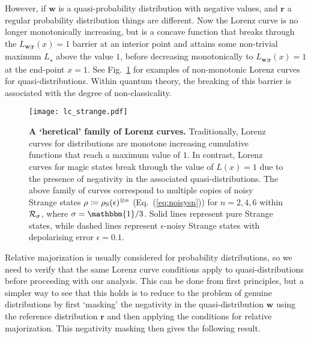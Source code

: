 \documentclass[
onecolumn,
superscriptaddress
]{revtex4-1}
\def\id{\mathbbm{1}}
\def\r{\boldsymbol{r}}
\def\w{\boldsymbol{w}}
\def\R{{\cal R}}
\begin{document}
However, if $\w$ is a quasi-probability distribution with negative values, and $\r$ a regular probability distribution things are different. Now the Lorenz curve is no longer monotonically increasing, but is a concave function that breaks through the $L_{\w|\r}(x) = 1$ barrier at an interior point and attains some non-trivial maximum $L_\star$ above the value $1$, before decreasing monotonically to $L_{\w|\r}(x)= 1$ at the end-point $x=1$. See Fig.~\ref{fig:lcs} for examples of non-monotonic Lorenz curves for quasi-distributions. Within quantum theory, the breaking of this barrier is associated with the degree of non-classicality.

\begin{figure}
    \centering
    \texttt{[image: lc\_strange.pdf]}
    \caption{\textbf{A `heretical' family of Lorenz curves.} Traditionally, Lorenz curves for distributions are monotone increasing cumulative functions that reach a maximum value of $1$. In contrast, Lorenz curves for magic states break through the value of $L(x)=1$ due to the presence of negativity in the associated quasi-distributions. The above family of curves correspond to multiple copies of noisy Strange states $\rho\coloneqq\rho_{\rm{S}}(\epsilon)^{\otimes n}$ (Eq.~(\ref{eq:noisysn})) for $n=2,4,6$ within $\R_{\sigma}$, where $\sigma = \id/3$. Solid lines represent pure Strange states, while dashed lines represent $\epsilon$-noisy Strange states with depolarising error $\epsilon = 0.1$.
    }
    \label{fig:lcs}
\end{figure}

Relative majorization is usually considered for probability distributions, so we need to verify that the same Lorenz curve conditions apply to quasi-distributions before proceeding with our analysis. This can be done from first principles, but a simpler way to see that this holds is to reduce to the problem of genuine distributions by first `masking' the negativity in the quasi-distribution $\w$ using the reference distribution $\r$ and then applying the conditions for relative majorization. This negativity masking then gives the following result.
\end{document}
